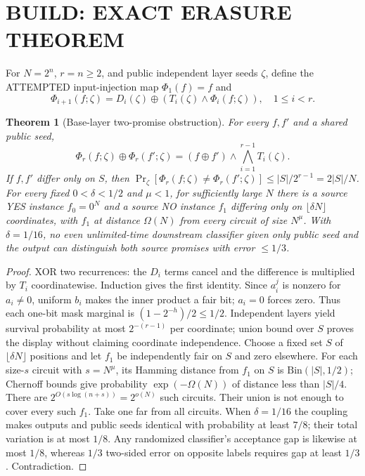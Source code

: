 \documentclass[11pt]{article}
\newtheorem{theorem}{Theorem}
\begin{document}
\section*{BUILD: EXACT ERASURE THEOREM}
For $N=2^n$, $r=n\ge2$, and public independent layer seeds $\zeta$, define the ATTEMPTED input-injection map $\Phi_1(f)=f$ and
\[
\Phi_{i+1}(f;\zeta)=D_i(\zeta)\oplus(T_i(\zeta)\wedge\Phi_i(f;\zeta)),\quad 1\le i<r.
\]
\begin{theorem}[Base-layer two-promise obstruction]
For every $f,f'$ and a shared public seed,
\[
\Phi_r(f;\zeta)\oplus\Phi_r(f';\zeta)
=(f\oplus f')\wedge\bigwedge_{i=1}^{r-1}T_i(\zeta).
\]
If $f,f'$ differ only on $S$, then
$\Pr_\zeta[\Phi_r(f;\zeta)\ne\Phi_r(f';\zeta)]
\le |S|/2^{r-1}=2|S|/N$.
For every fixed $0<\delta<1/2$ and $\mu<1$, for sufficiently large $N$ there is a source YES instance $f_0=0^N$ and a source NO instance $f_1$ differing only on $\lfloor\delta N\rfloor$ coordinates, with $f_1$ at distance $\Omega(N)$ from every circuit of size $N^\mu$. With $\delta=1/16$, no even unlimited-time downstream classifier given only public seed and the output can distinguish both source promises with error $\le1/3$.
\end{theorem}
\begin{proof}
XOR two recurrences: the $D_i$ terms cancel and the difference is multiplied by $T_i$ coordinatewise. Induction gives the first identity. Since $a_i^j$ is nonzero for $a_i\ne0$, uniform $b_i$ makes the inner product a fair bit; $a_i=0$ forces zero. Thus each one-bit mask marginal is $(1-2^{-h})/2\le1/2$. Independent layers yield survival probability at most $2^{-(r-1)}$ per coordinate; union bound over $S$ proves the display without claiming coordinate independence.
Choose a fixed set $S$ of $\lfloor\delta N\rfloor$ positions and let $f_1$ be independently fair on $S$ and zero elsewhere. For each size-$s$ circuit with $s=N^\mu$, its Hamming distance from $f_1$ on $S$ is $\mathrm{Bin}(|S|,1/2)$; Chernoff bounds give probability $\exp(-\Omega(N))$ of distance less than $|S|/4$. There are $2^{O(s\log(n+s))}=2^{o(N)}$ such circuits. Their union is not enough to cover every such $f_1$. Take one far from all circuits. When $\delta=1/16$ the coupling makes outputs and public seeds identical with probability at least $7/8$; their total variation is at most $1/8$. Any randomized classifier's acceptance gap is likewise at most $1/8$, whereas $1/3$ two-sided error on opposite labels requires gap at least $1/3$. Contradiction.
\end{proof}
\end{document}
